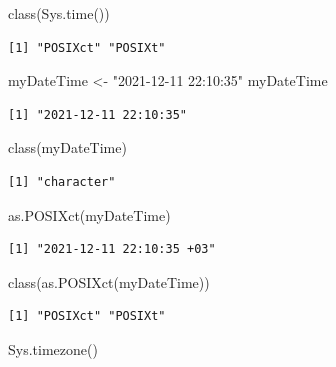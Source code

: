 \documentclass[
  letterpaper,
  DIV=11,
  numbers=noendperiod]{scrreprt}
\newenvironment{Shaded}{\begin{snugshade}}{\end{snugshade}}
\newcommand{\FunctionTok}[1]{\textcolor[rgb]{0.28,0.35,0.67}{#1}}
\newcommand{\NormalTok}[1]{\textcolor[rgb]{0.00,0.23,0.31}{#1}}
\newcommand{\OtherTok}[1]{\textcolor[rgb]{0.00,0.23,0.31}{#1}}
\newcommand{\StringTok}[1]{\textcolor[rgb]{0.13,0.47,0.30}{#1}}
\begin{document}
\begin{Shaded}
\begin{Highlighting}[]
\FunctionTok{class}\NormalTok{(}\FunctionTok{Sys.time}\NormalTok{())}
\end{Highlighting}
\end{Shaded}

\begin{verbatim}
[1] "POSIXct" "POSIXt" 
\end{verbatim}

\begin{Shaded}
\begin{Highlighting}[]
\NormalTok{myDateTime }\OtherTok{\textless{}{-}} \StringTok{"2021{-}12{-}11 22:10:35"}
\NormalTok{myDateTime}
\end{Highlighting}
\end{Shaded}

\begin{verbatim}
[1] "2021-12-11 22:10:35"
\end{verbatim}

\begin{Shaded}
\begin{Highlighting}[]
\FunctionTok{class}\NormalTok{(myDateTime)}
\end{Highlighting}
\end{Shaded}

\begin{verbatim}
[1] "character"
\end{verbatim}

\begin{Shaded}
\begin{Highlighting}[]
\FunctionTok{as.POSIXct}\NormalTok{(myDateTime)}
\end{Highlighting}
\end{Shaded}

\begin{verbatim}
[1] "2021-12-11 22:10:35 +03"
\end{verbatim}

\begin{Shaded}
\begin{Highlighting}[]
\FunctionTok{class}\NormalTok{(}\FunctionTok{as.POSIXct}\NormalTok{(myDateTime))}
\end{Highlighting}
\end{Shaded}

\begin{verbatim}
[1] "POSIXct" "POSIXt" 
\end{verbatim}

\begin{Shaded}
\begin{Highlighting}[]
\FunctionTok{Sys.timezone}\NormalTok{()}
\end{Highlighting}
\end{Shaded}
\end{document}
